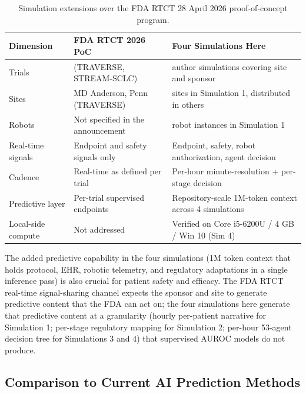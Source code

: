 \begin{table}[H]
\centering
\caption{Simulation extensions over the FDA RTCT 28 April 2026
proof-of-concept program.}
\label{tab:disc-fda-extension}
{\renewcommand{\arraystretch}{1.15}
\begin{tabular}{>{\raggedright\arraybackslash}p{3.0cm} >{\raggedright\arraybackslash}p{4.5cm} >{\raggedright\arraybackslash}p{5.0cm}}
\toprule
\textbf{Dimension} & \textbf{FDA RTCT 2026 PoC} & \textbf{Four Simulations Here} \\
\midrule
Trials                 & 2 (TRAVERSE, STREAM-SCLC)                & 4 author simulations covering site and sponsor       \\
Sites                  & MD Anderson, Penn (TRAVERSE)             & 4 sites in Simulation 1, distributed in others        \\
Robots                 & Not specified in the announcement         & 116 robot instances in Simulation 1                   \\
Real-time signals      & Endpoint and safety signals only         & Endpoint, safety, robot authorization, agent decision \\
Cadence                & Real-time as defined per trial            & Per-hour minute-resolution + per-stage decision       \\
Predictive layer       & Per-trial supervised endpoints            & Repository-scale 1M-token context across 4 simulations\\
Local-side compute     & Not addressed                            & Verified on Core i5-6200U / 4 GB / Win 10 (Sim 4)     \\
\bottomrule
\end{tabular}}
\end{table}

The added predictive capability in the four simulations (1M token
context that holds protocol, EHR, robotic telemetry, and regulatory
adaptations in a single inference pass) is also crucial for patient
safety and efficacy. The FDA RTCT real-time signal-sharing channel
expects the sponsor and site to generate predictive content that the
FDA can act on; the four simulations here generate that predictive
content at a granularity (hourly per-patient narrative for Simulation
1; per-stage regulatory mapping for Simulation 2; per-hour 53-agent
decision tree for Simulations 3 and 4) that supervised AUROC models
do not produce.

\subsection{Comparison to Current AI Prediction Methods}
\label{sec:disc-ai-baseline}

